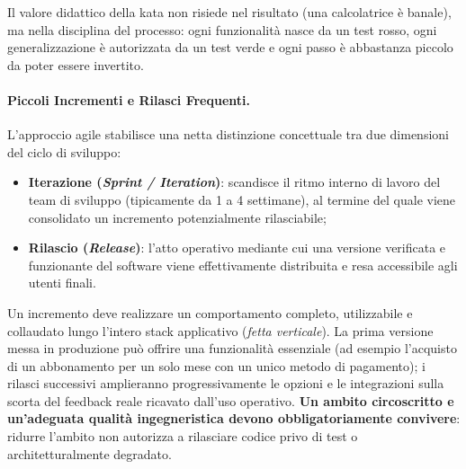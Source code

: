 \documentclass[12pt]{extarticle}
\begin{document}
\noindent Il valore didattico della kata non risiede nel risultato (una calcolatrice è banale), ma nella disciplina del processo: ogni funzionalità nasce da un test rosso, ogni generalizzazione è autorizzata da un test verde e ogni passo è abbastanza piccolo da poter essere invertito.

\paragraph{Piccoli Incrementi e Rilasci Frequenti.}
L'approccio agile stabilisce una netta distinzione concettuale tra due dimensioni del ciclo di sviluppo:
\begin{itemize}
    \item \textbf{Iterazione (\textit{Sprint / Iteration})}: scandisce il ritmo interno di lavoro del team di sviluppo (tipicamente da 1 a 4 settimane), al termine del quale viene consolidato un incremento potenzialmente rilasciabile;
    \item \textbf{Rilascio (\textit{Release})}: l'atto operativo mediante cui una versione verificata e funzionante del software viene effettivamente distribuita e resa accessibile agli utenti finali.
\end{itemize}
\noindent Un incremento deve realizzare un comportamento completo, utilizzabile e collaudato lungo l'intero stack applicativo (\textit{fetta verticale}). La prima versione messa in produzione può offrire una funzionalità essenziale (ad esempio l'acquisto di un abbonamento per un solo mese con un unico metodo di pagamento); i rilasci successivi amplieranno progressivamente le opzioni e le integrazioni sulla scorta del feedback reale ricavato dall'uso operativo. \textbf{Un ambito circoscritto e un'adeguata qualità ingegneristica devono obbligatoriamente convivere}: ridurre l'ambito non autorizza a rilasciare codice privo di test o architetturalmente degradato.
\end{document}
